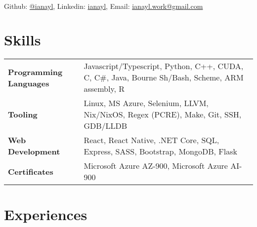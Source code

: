 \documentclass[9pt]{article}
\author{Ian Li}
\makeatletter
\renewcommand{\maketitle}{
		\vspace{-8em}
    \begin{center}
		{\huge\bfseries
		\theauthor}
    \vspace{0.5em}
    \\
    Github: \href{https://github.com/ianayl}{@ianayl}, Linkedin: \href{https://www.linkedin.com/in/ianayl}{ianayl}, Email: \url{ianayl.work@gmail.com}
    \end{center}
    \vspace{-1.5em}
}
\makeatother
\begin{document}
\maketitle


\section{Skills}

\begin{tabular}{ l l }
    \textbf{Programming Languages} & Javascript/Typescript, Python, C++, CUDA, C, C\#, Java, Bourne Sh/Bash, Scheme, ARM assembly, R \\
    \textbf{Tooling} & Linux, MS Azure, Selenium, LLVM, Nix/NixOS, Regex (PCRE), Make, Git, SSH, GDB/LLDB \\
    \textbf{Web Development} & React, React Native, .NET Core, SQL, Express, SASS, Bootstrap, MongoDB, Flask \\
    \textbf{Certificates} & Microsoft Azure AZ-900, Microsoft Azure AI-900
\end{tabular}

\section*{Experiences}

\end{document}
